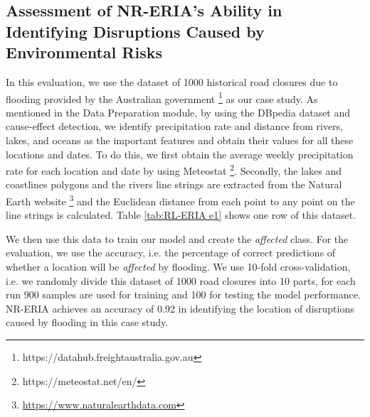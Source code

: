 \documentclass[]{ceurart}
\begin{document}
\subsection{Assessment of NR-ERIA's Ability in Identifying Disruptions Caused by Environmental Risks}

In this evaluation, we use the dataset of 1000 historical road closures due to flooding provided by the Australian government \footnote{https://datahub.freightaustralia.gov.au} as our case study. As mentioned in the Data Preparation module, by using the DBpedia dataset and cause-effect detection, we identify precipitation rate and distance from rivers, lakes, and oceans as the important features and obtain their values for all these locations and dates. To do this, we first obtain the average weekly precipitation rate for each location and date by using Meteostat \footnote{https://meteostat.net/en/}. Secondly, the lakes and coastlines polygons and the rivers line strings are extracted from the Natural Earth website \footnote{\url{https://www.naturalearthdata.com}} and the Euclidean distance from each point to any point on the line strings is calculated. Table \ref{tab:RL-ERIA e1} shows one row of this dataset.

\begin{table}[h]

\caption{1 row of \emph{normal} dataset for 1000 road closures due to flood}
\label{tab:RL-ERIA e1}
  \centering
\end{table}


We then use this data to train our model and create the \textit{affected} class. For the evaluation, we use the accuracy, i.e. the percentage of correct predictions of whether a location will be \textit{affected} by flooding. 
We use 10-fold cross-validation, i.e. we randomly divide this dataset of 1000 road closures into 10 parts, for each run 900 samples are used for training and 100 for testing the model performance. 
NR-ERIA achieves an accuracy of 0.92 in identifying the location of disruptions caused by flooding in this case study.
\end{document}
